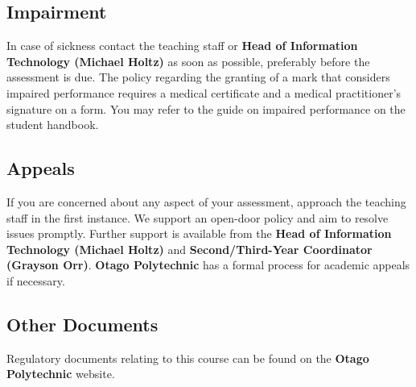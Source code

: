 \documentclass{article}
\begin{document}
\subsection*{Impairment}
In case of sickness contact the teaching staff or \textbf{Head of Information Technology (Michael Holtz)} as soon as possible, preferably before the assessment is due. The policy regarding the granting of a mark that considers impaired performance requires a medical certificate and a medical practitioner’s signature on a form. You may refer to the guide on impaired performance on the student handbook.

\subsection*{Appeals}
If you are concerned about any aspect of your assessment, approach the teaching staff in the first instance. We support an open-door policy and aim to resolve issues promptly. Further support is available from the \textbf{Head of Information Technology (Michael Holtz)} and \textbf{Second/Third-Year Coordinator (Grayson Orr)}. \textbf{Otago Polytechnic} has a formal process for academic appeals if necessary.

\subsection*{Other Documents}
Regulatory documents relating to this course can be found on the \textbf{Otago Polytechnic} website.
\end{document}
